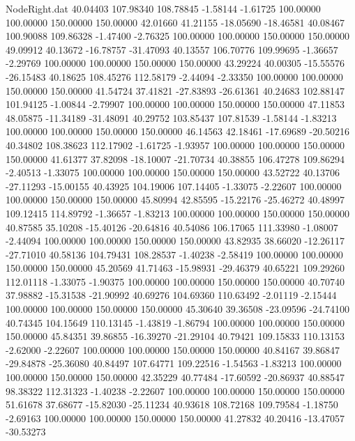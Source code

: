 \begin{filecontents}{NodeRight.dat}
  40.04403  107.98340  108.78845    -1.58144   -1.61725  100.00000  100.00000  150.00000  150.00000   42.01660   41.21155  -18.05690  -18.46581
  40.08467  100.90088  109.86328    -1.47400   -2.76325  100.00000  100.00000  150.00000  150.00000   49.09912   40.13672  -16.78757  -31.47093
  40.13557  106.70776  109.99695    -1.36657   -2.29769  100.00000  100.00000  150.00000  150.00000   43.29224   40.00305  -15.55576  -26.15483
  40.18625  108.45276  112.58179    -2.44094   -2.33350  100.00000  100.00000  150.00000  150.00000   41.54724   37.41821  -27.83893  -26.61361
  40.24683  102.88147  101.94125    -1.00844   -2.79907  100.00000  100.00000  150.00000  150.00000   47.11853   48.05875  -11.34189  -31.48091
  40.29752  103.85437  107.81539    -1.58144   -1.83213  100.00000  100.00000  150.00000  150.00000   46.14563   42.18461  -17.69689  -20.50216
  40.34802  108.38623  112.17902    -1.61725   -1.93957  100.00000  100.00000  150.00000  150.00000   41.61377   37.82098  -18.10007  -21.70734
  40.38855  106.47278  109.86294    -2.40513   -1.33075  100.00000  100.00000  150.00000  150.00000   43.52722   40.13706  -27.11293  -15.00155
  40.43925  104.19006  107.14405    -1.33075   -2.22607  100.00000  100.00000  150.00000  150.00000   45.80994   42.85595  -15.22176  -25.46272
  40.48997  109.12415  114.89792    -1.36657   -1.83213  100.00000  100.00000  150.00000  150.00000   40.87585   35.10208  -15.40126  -20.64816
  40.54086  106.17065  111.33980    -1.08007   -2.44094  100.00000  100.00000  150.00000  150.00000   43.82935   38.66020  -12.26117  -27.71010
  40.58136  104.79431  108.28537    -1.40238   -2.58419  100.00000  100.00000  150.00000  150.00000   45.20569   41.71463  -15.98931  -29.46379
  40.65221  109.29260  112.01118    -1.33075   -1.90375  100.00000  100.00000  150.00000  150.00000   40.70740   37.98882  -15.31538  -21.90992
  40.69276  104.69360  110.63492    -2.01119   -2.15444  100.00000  100.00000  150.00000  150.00000   45.30640   39.36508  -23.09596  -24.74100
  40.74345  104.15649  110.13145    -1.43819   -1.86794  100.00000  100.00000  150.00000  150.00000   45.84351   39.86855  -16.39270  -21.29104
  40.79421  109.15833  110.13153    -2.62000   -2.22607  100.00000  100.00000  150.00000  150.00000   40.84167   39.86847  -29.84878  -25.36080
  40.84497  107.64771  109.22516    -1.54563   -1.83213  100.00000  100.00000  150.00000  150.00000   42.35229   40.77484  -17.60592  -20.86937
  40.88547   98.38322  112.31323    -1.40238   -2.22607  100.00000  100.00000  150.00000  150.00000   51.61678   37.68677  -15.82030  -25.11234
  40.93618  108.72168  109.79584    -1.18750   -2.69163  100.00000  100.00000  150.00000  150.00000   41.27832   40.20416  -13.47057  -30.53273

\end{filecontents}
